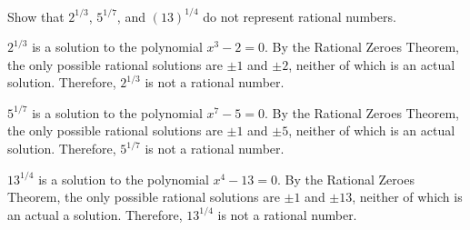 
Show that $2^{1/3}$, $5^{1/7}$, and $(13)^{1/4}$ do not represent
rational numbers.

\medskip
$2^{1/3}$ is a solution to the polynomial $x^3-2=0$.
By the Rational Zeroes Theorem, the only possible rational solutions are
$\pm1$ and $\pm2$, neither of which is an actual solution.
Therefore, $2^{1/3}$ is not a rational number.

\medskip
$5^{1/7}$ is a solution to the polynomial $x^7-5=0$.
By the Rational Zeroes Theorem, the only possible rational solutions are
$\pm1$ and $\pm5$, neither of which is an actual solution.
Therefore, $5^{1/7}$ is not a rational number.

\medskip
$13^{1/4}$ is a solution to the polynomial $x^4-13=0$.
By the Rational Zeroes Theorem, the only possible rational solutions are
$\pm1$ and $\pm13$, neither of which is an actual a solution.
Therefore, $13^{1/4}$ is not a rational number.

